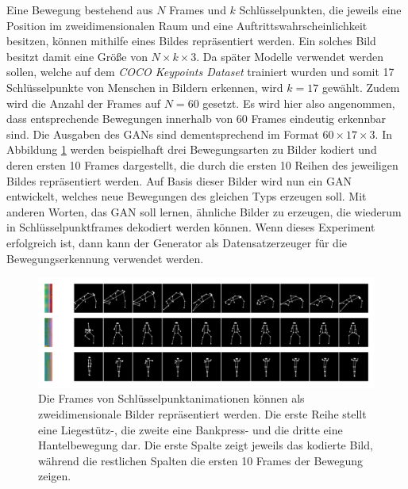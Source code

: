 Eine Bewegung bestehend aus $N$ Frames und $k$ Schlüsselpunkten, die jeweils
eine Position im zweidimensionalen Raum und eine Auftrittswahrscheinlichkeit
besitzen, können mithilfe eines Bildes repräsentiert werden. Ein solches Bild
besitzt damit eine Größe von $N \times k \times 3$. Da später Modelle
verwendet werden sollen, welche auf dem \textit{COCO Keypoints Dataset}
\cite{lin2015microsoft} trainiert wurden und somit 17 Schlüsselpunkte von
Menschen in Bildern erkennen, wird $k = 17$ gewählt. Zudem wird die Anzahl der
Frames auf $N = 60$ gesetzt. Es wird hier also angenommen, dass entsprechende
Bewegungen innerhalb von 60 Frames eindeutig erkennbar sind. Die Ausgaben des
GANs sind dementsprechend im Format $60 \times 17 \times 3$. In Abbildung
\ref{fig:motion-images} werden beispielhaft drei Bewegungsarten zu Bilder
kodiert und deren ersten 10 Frames dargestellt, die durch die ersten 10 Reihen
des jeweiligen Bildes repräsentiert werden. Auf Basis dieser Bilder wird nun ein
GAN entwickelt, welches neue Bewegungen des gleichen Typs erzeugen soll. Mit
anderen Worten, das GAN soll lernen, ähnliche Bilder zu erzeugen, die wiederum
in Schlüsselpunktframes dekodiert werden können. Wenn dieses Experiment
erfolgreich ist, dann kann der Generator als Datensatzerzeuger für die
Bewegungserkennung verwendet werden.

\begin{figure}
    \includegraphics[width=\textwidth]{images/motion_image.png}
    \caption{Die Frames von Schlüsselpunktanimationen können als
    zweidimensionale Bilder repräsentiert werden. Die erste Reihe stellt eine
    Liegestütz-, die zweite eine Bankpress- und die dritte eine Hantelbewegung
    dar. Die erste Spalte zeigt jeweils das kodierte Bild, während die
    restlichen Spalten die ersten 10 Frames der Bewegung zeigen.}
    \label{fig:motion-images}
\end{figure}


